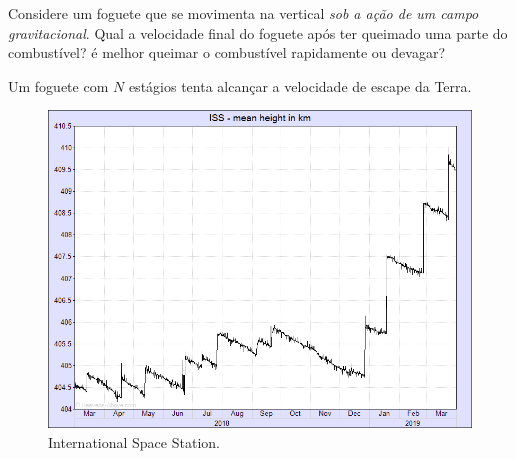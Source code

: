 \documentclass[]{IMTexam}
\begin{document}
\begin{questions}



	\question Considere um foguete que se movimenta na vertical \textit{sob a ação de um campo gravitacional}. Qual a velocidade final do foguete após ter queimado uma parte do combustível? é melhor queimar o combustível rapidamente ou devagar?

	\begin{solution}

	\end{solution}



	\question Um foguete com $ N $ estágios tenta alcançar a velocidade de escape da Terra.

	\begin{figure}[H]
		\centering
		\includegraphics[width=0.7\linewidth]{screenshot002}
		\caption{International Space Station.}
		\label{fig:fig2}
	\end{figure}


\end{questions}
\end{document}
